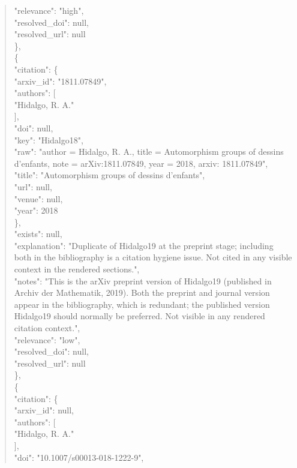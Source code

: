 \documentclass[11pt]{article}
\begin{document}
\begin{quote}
      "relevance": "high",\\
      "resolved\_doi": null,\\
      "resolved\_url": null\\
    \},\\
    \{\\
      "citation": \{\\
        "arxiv\_id": "1811.07849",\\
        "authors": [\\
          "Hidalgo, R. A."\\
        ],\\
        "doi": null,\\
        "key": "Hidalgo18",\\
        "raw": "author = Hidalgo, R. A., title = Automorphism groups of dessins d'enfants, note = arXiv:1811.07849, year = 2018, arxiv: 1811.07849",\\
        "title": "Automorphism groups of dessins d'enfants",\\
        "url": null,\\
        "venue": null,\\
        "year": 2018\\
      \},\\
      "exists": null,\\
      "explanation": "Duplicate of Hidalgo19 at the preprint stage; including both in the bibliography is a citation hygiene issue. Not cited in any visible context in the rendered sections.",\\
      "notes": "This is the arXiv preprint version of Hidalgo19 (published in Archiv der Mathematik, 2019). Both the preprint and journal version appear in the bibliography, which is redundant; the published version Hidalgo19 should normally be preferred. Not visible in any rendered citation context.",\\
      "relevance": "low",\\
      "resolved\_doi": null,\\
      "resolved\_url": null\\
    \},\\
    \{\\
      "citation": \{\\
        "arxiv\_id": null,\\
        "authors": [\\
          "Hidalgo, R. A."\\
        ],\\
        "doi": "10.1007/s00013-018-1222-9",\\

\end{quote}
\end{document}
